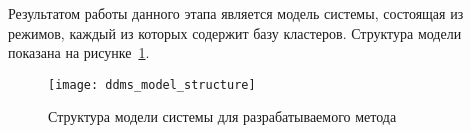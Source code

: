 Результатом работы данного этапа является модель системы, состоящая из режимов, каждый из которых содержит базу кластеров. Структура модели показана на рисунке~\ref{fig:spec:DDMS:ModelStructure}.

\begin{figure}[h]
	\texttt{[image: ddms\_model\_structure]}
	\caption{Структура модели системы для разрабатываемого метода}
	\label{fig:spec:DDMS:ModelStructure}
\end{figure}